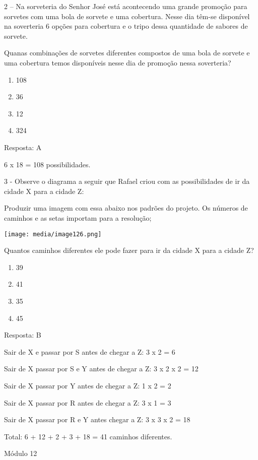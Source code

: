 2 -- Na sorveteria do Senhor José está acontecendo uma grande promoção
para sorvetes com uma bola de sorvete e uma cobertura. Nesse dia têm-se
disponível na soverteria 6 opções para cobertura e o tripo dessa
quantidade de sabores de sorvete.

Quanas combinações de sorvetes diferentes compostos de uma bola de
sorvete e uma cobertura temos disponíveis nesse dia de promoção nessa
soverteria?

\begin{enumerate}
\def\labelenumi{\alph{enumi})}
\item
  108
\item
  36
\item
  12
\item
  324
\end{enumerate}

Resposta: A

6 x 18 = 108 possibilidades.

3 - Observe o diagrama a seguir que Rafael criou com as possibilidades
de ir da cidade X para a cidade Z:

Produzir uma imagem com essa abaixo nos padrões do projeto. \textbar{}Os
números de caminhos e as setas importam para a resolução;

\texttt{[image: media/image126.png]}

Quantos caminhos diferentes ele pode fazer para ir da cidade X para a
cidade Z?

\begin{enumerate}
\def\labelenumi{\alph{enumi})}
\item
  39
\item
  41
\item
  35
\item
  45
\end{enumerate}

Resposta: B

Sair de X e passar por S antes de chegar a Z: 3 x 2 = 6

Sair de X passar por S e Y antes de chegar a Z: 3 x 2 x 2 = 12

Sair de X passar por Y antes de chegar a Z: 1 x 2 = 2

Sair de X passar por R antes de chegar a Z: 3 x 1 = 3

Sair de X passar por R e Y antes chegar a Z: 3 x 3 x 2 = 18

Total: 6 + 12 + 2 + 3 + 18 = 41 caminhos diferentes.

Módulo 12

